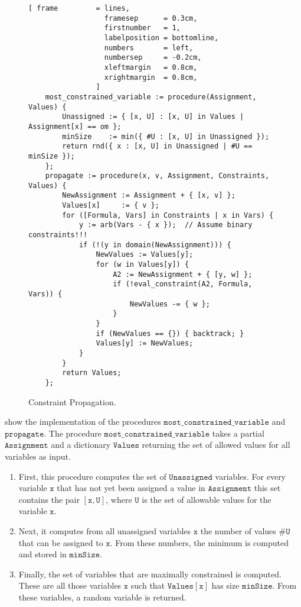 \begin{figure}[!ht]
\centering
\begin{Verbatim}[ frame         = lines, 
                  framesep      = 0.3cm, 
                  firstnumber   = 1,
                  labelposition = bottomline,
                  numbers       = left,
                  numbersep     = -0.2cm,
                  xleftmargin   = 0.8cm,
                  xrightmargin  = 0.8cm,
                ]
    most_constrained_variable := procedure(Assignment, Values) {
        Unassigned := { [x, U] : [x, U] in Values | Assignment[x] == om };
        minSize    := min({ #U : [x, U] in Unassigned });
        return rnd({ x : [x, U] in Unassigned | #U == minSize });
    };
    propagate := procedure(x, v, Assignment, Constraints, Values) {
        NewAssignment := Assignment + { [x, v] };
        Values[x]     := { v };
        for ([Formula, Vars] in Constraints | x in Vars) {
            y := arb(Vars - { x });  // Assume binary constraints!!!
            if (!(y in domain(NewAssignment))) {
                NewValues := Values[y];
                for (w in Values[y]) {
                    A2 := NewAssignment + { [y, w] };
                    if (!eval_constraint(A2, Formula, Vars)) {
                        NewValues -= { w };
                    }
                }
                if (NewValues == {}) { backtrack; }
                Values[y] := NewValues;
            }
        }
        return Values;
    };
\end{Verbatim}
\vspace*{-0.3cm}
\caption{Constraint Propagation.}
\label{fig:csp-constraint-propagation.stlx-2}
\end{figure}
 show the implementation of the procedures $\mathtt{most\_constrained\_variable}$
and $\mathtt{propagate}$.  The procedure $\mathtt{most\_constrained\_variable}$ takes a partial
$\mathtt{Assignment}$ and a dictionary $\mathtt{Values}$ returning the set of allowed values for all variables as input.
\begin{enumerate}
\item First, this procedure computes the set of $\mathtt{Unassigned}$ variables.  For every variable $\mathtt{x}$ that
      has not yet been assigned a value in $\mathtt{Assignment}$ this set contains the pair 
      $[\mathtt{x}, \mathtt{U}]$, where $\mathtt{U}$ is the set of allowable values for the variable  $\mathtt{x}$.
\item Next, it computes from all unassigned variables $\mathtt{x}$ the number of values $\mathtt{\#U}$ 
      that can be assigned to $\mathtt{x}$.  From these numbers, the minimum is computed and stored in $\mathtt{minSize}$.  
\item Finally, the set of variables that are maximally constrained is computed.  These are all those variables
      $\mathtt{x}$ such that $\mathtt{Values[x]}$ has size $\mathtt{minSize}$.  From these variables, a random
      variable is returned.
\end{enumerate}

